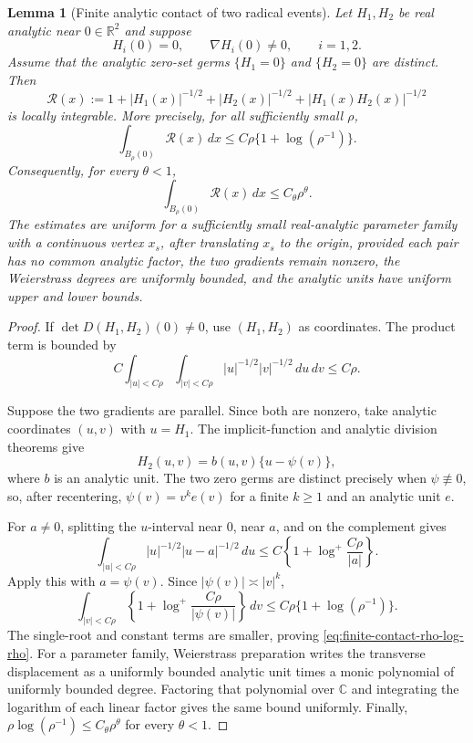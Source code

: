 \documentclass[11pt]{article}
\newtheorem{lemma}[theorem]{Lemma}
\begin{document}
\begin{lemma}[Finite analytic contact of two radical events]
\label{lem:finite-contact-two-root-integrability}
Let $H_1,H_2$ be real analytic near $0\in\mathbb R^2$ and suppose
\[
 H_i(0)=0,\qquad \nabla H_i(0)\ne0,\qquad i=1,2.
\]
Assume that the analytic zero-set germs $\{H_1=0\}$ and $\{H_2=0\}$ are
distinct.  Then
\[
 \mathcal R(x):=
 1+|H_1(x)|^{-1/2}+|H_2(x)|^{-1/2}
   +|H_1(x)H_2(x)|^{-1/2}
\]
is locally integrable.  More precisely, for all sufficiently small $\rho$,
\begin{equation}
\label{eq:finite-contact-rho-log-rho}
 \int_{B_\rho(0)}\mathcal R(x)\,dx
 \le C\rho\{1+\log(\rho^{-1})\}.
\end{equation}
Consequently, for every $\theta<1$,
\begin{equation}
\label{eq:finite-contact-power-tightness}
 \int_{B_\rho(0)}\mathcal R(x)\,dx
 \le C_\theta\rho^\theta.
\end{equation}
The estimates are uniform for a sufficiently small real-analytic parameter
family with a continuous vertex $x_s$, after translating $x_s$ to the
origin, provided each pair has no common analytic factor, the two gradients
remain nonzero, the Weierstrass degrees are uniformly bounded, and the
analytic units have uniform upper and lower bounds.
\end{lemma}

\begin{proof}
If $\det D(H_1,H_2)(0)\ne0$, use $(H_1,H_2)$ as coordinates.  The product
term is bounded by
\[
 C\int_{|u|<C\rho}\int_{|v|<C\rho}
 |u|^{-1/2}|v|^{-1/2}\,du\,dv\le C\rho.
\]

Suppose the two gradients are parallel.  Since both are nonzero, take
analytic coordinates $(u,v)$ with $u=H_1$.  The implicit-function and
analytic division theorems give
\[
 H_2(u,v)=b(u,v)\{u-\psi(v)\},
\]
where $b$ is an analytic unit.  The two zero germs are distinct precisely
when $\psi\not\equiv0$, so, after recentering,
$\psi(v)=v^ke(v)$ for a finite $k\ge1$ and an analytic unit $e$.

For $a\ne0$, splitting the $u$-interval near $0$, near $a$, and on the
complement gives
\begin{equation}
\label{eq:two-root-inner-log}
 \int_{|u|<C\rho}|u|^{-1/2}|u-a|^{-1/2}\,du
 \le C\left\{1+\log^+\frac{C\rho}{|a|}\right\}.
\end{equation}
Apply this with $a=\psi(v)$.  Since
$|\psi(v)|\asymp|v|^k$,
\[
 \int_{|v|<C\rho}
 \left\{1+\log^+\frac{C\rho}{|\psi(v)|}\right\}\,dv
 \le C\rho\{1+\log(\rho^{-1})\}.
\]
The single-root and constant terms are smaller, proving
\eqref{eq:finite-contact-rho-log-rho}.  For a parameter family,
Weierstrass preparation writes the transverse displacement as a uniformly
bounded analytic unit times a monic polynomial of uniformly bounded degree.
Factoring that polynomial over $\mathbb C$ and integrating the logarithm of
each linear factor gives the same bound uniformly.  Finally,
$\rho\log(\rho^{-1})\le C_\theta\rho^\theta$ for every $\theta<1$.
\end{proof}
\end{document}
